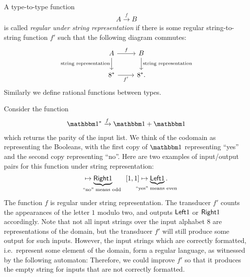 \begin{definition}\label{def:regular-functions-on-types-under-string-representation}
    A type-to-type function
    \begin{align*}
    A \xrightarrow f  B
    \end{align*}
    is called \emph{regular under string representation} if there is some regular string-to-string function $f'$ such that the following diagram commutes:
    \[
    \begin{tikzcd}
    A 
    \ar[r,"f"]
    \ar[d,"\text{string representation}"']
    &
    \ar[d,"\text{string representation}"]
    B
    \\
    8^* 
    \ar[r,"f'"']
    &
    8^*.
    \end{tikzcd}
    \]
     Similarly we define rational functions between types.
\end{definition}

\begin{myexample}
    Consider the function 
    \begin{align*}
    \onetype^* \xrightarrow f \onetype + \onetype
    \end{align*}
    which returns the parity of the input list. We think of the codomain as representing the Booleans, with the first copy of $\onetype$ representing ``yes'' and the second copy representing ``no''. Here are two examples of input/output pairs for this function under string representation:
    \begin{align*}
    [\onelement,\onelement,\onelement] \mapsto \myunderbrace{\rightterm\onelement}{``no'' means odd} \qquad [\onelement,\onelement] \mapsto \myunderbrace{\leftterm\onelement}{``yes'' means even}.
    \end{align*}
    The function $f$ is regular under string representation. The transducer $f'$ counts the appearances of the letter $1$ modulo two, and outputs $\mathsf{Left}1$ or $\mathsf{Right}1$ accordingly. Note that not all input strings over the input alphabet $8$ are representations of the domain, but the transducer $f'$ will still produce some output  for such inputs. However, the input strings which are correctly formatted, i.e.~represent some element of the domain, form a regular language, as witnessed by the following automaton:
Therefore, we could improve $f'$ so that it produces the empty string for inputs that are not correctly formatted.
\end{myexample}


